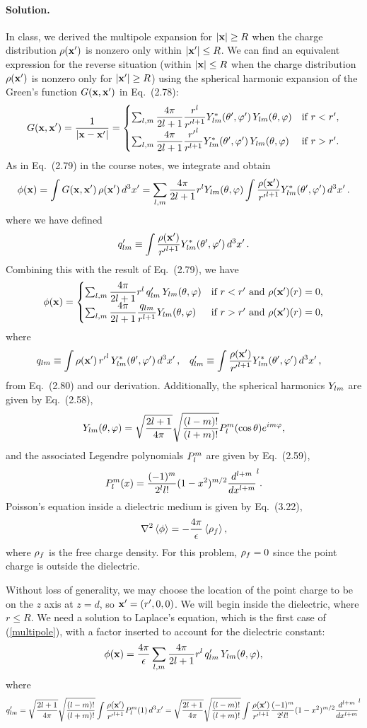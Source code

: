 \documentclass[11pt]{article}
\newcommand{\refeq}[1]{(\ref{#1})}
\newcommand{\beq}{\begin{equation*}}
\newcommand{\eeq}{\end{equation*}}
\newcommand{\beqn}{\begin{equation}}
\newcommand{\eeqn}{\end{equation}}
\newenvironment{solution}
{
    \paragraph{Solution.}
    \ignorespaces
}
{
    \bigskip
}
\begin{document}
\begin{solution}
	In class, we derived the multipole expansion for $\abs{\mathbf{x}} \geq R$ when the charge distribution $\rho(\mathbf{x}')$ is nonzero only within $\abs{\mathbf{x}'} \leq R$.  We can find an equivalent expression for the reverse situation (within $\abs{\mathbf{x}} \leq R$ when the charge distribution $\rho(\mathbf{x}')$ is nonzero only for $\abs{\mathbf{x}'} \geq R$) using the spherical harmonic expansion of the Green's function $G(\mathbf{x}, \mathbf{x}')$ in Eq.~(2.78):
	\beq
		\Gxxp = \frac{1}{\abs{\vx - \vx'}}
		= \begin{cases} \sum_{l,m} \dfrac{4\pi}{2l + 1} \dfrac{r^l}{{r'}^{l + 1}} \Ylm^*\tvp \, \Ylm\tv & \text{if } r < r', \\
		\sum_{l,m} \dfrac{4\pi}{2l + 1} \dfrac{{r'}^l}{r^{l + 1}} \Ylm^*\tvp \, \Ylm\tv & \text{if } r > r'. \end{cases}
	\eeq
	As in Eq.~(2.79) in the course notes, we integrate and obtain
	\beq
		\phix = \int \Gxxp \, \rhoxp \dcxp
		= \sum_{l, m} \frac{4\pi}{2l + 1} r^l \Ylm\tv \int \frac{\rhoxp}{{r'}^{l+1}} \Ylm^*\tvp \dcxp.
	\eeq
	where we have defined
	\beq
		\qplm \equiv \int \frac{\rhoxp}{{r'}^{l+1}} \Ylm^*\tvp \dcxp.
	\eeq
	Combining this with the result of Eq.~(2.79), we have
	\beqn \label{multipole}
		\phix = \begin{cases} \sum_{l, m} \dfrac{4\pi}{2l + 1} r^l \, \qplm \, \Ylm\tv & \text{if } r < r' \text{ and } \rhoxp(r) = 0, \\
		\sum_{l,m} \dfrac{4\pi}{2l + 1} \dfrac{\qlm}{r^{l+1}} \Ylm\tv & \text{if } r > r'  \text{ and } \rhoxp(r) = 0, \end{cases}
	\eeqn
	where
	\begin{align*}
		q_{l m} &\equiv \int \rho(\mathbf{x}') \, {r'}^l \, Y_{l m}^*(\theta', \varphi') \dd[3]{x'}, &
		q'_{l m} &\equiv \int \frac{\rho(\mathbf{x}')}{{r'}^{l+1}} Y_{l m}^*(\theta', \varphi') \dd[3]{x'},
	\end{align*}
	from Eq.~(2.80) and our derivation.  Additionally, the spherical harmonics $Y_{l m}$ are given by Eq.~(2.58),
	\beq
		\Ylm\tv = \sqrt{\frac{2l + 1}{4\pi}} \sqrt{\frac{(l - m)!}{(l + m)!}} \Plm(\cost) e^{i m \vph},
	\eeq
	and the associated Legendre polynomials $P_l^m$ are given by Eq.~(2.59),
	\beq
		\Plm(x) = \frac{(-1)^m}{2^l l!} (1 - x^2)^{m/2} \dv[l + m]{}{x} (x^2 - 1)^l.
	\eeq	
	Poisson's equation inside a dielectric medium is given by Eq.~(3.22),
	\beq
		\lap\evphi = -\frac{4\pi}{\eps} \ev{\rhof},
	\eeq
	where $\rho_f$ is the free charge density.  For this problem, $\rho_f = 0$ since the point charge is outside the dielectric.
	
	Without loss of generality, we may choose the location of the point charge to be on the $z$ axis at $z = d$, so $\mathbf{x}' = (r', 0, 0)$.  We will begin inside the dielectric, where $r \leq R$.  We need a solution to Laplace's equation, which is the first case of \refeq{multipole}, with a factor inserted to account for the dielectric constant:
	\beq
		\phix = \fe \sum_{l, m} \frac{4\pi}{2l + 1} r^l \, \qplm \, \Ylm\tv,
	\eeq
	where
	\beq
		\qplm = \sqrt{\frac{2l + 1}{4\pi}} \sqrt{\frac{(l - m)!}{(l + m)!}} \int \frac{\rhoxp}{{r'}^{l+1}} \Plm(1) \dcxp
		= \sqrt{\frac{2l + 1}{4\pi}} \sqrt{\frac{(l - m)!}{(l + m)!}} \int \frac{\rhoxp}{{r'}^{l+1}} \frac{(-1)^m}{2^l l!} (1 - x^2)^{m/2} \dv[l + m]{}{x} (x^2 - 1)^l
	\eeq
	

\end{solution}
\end{document}
